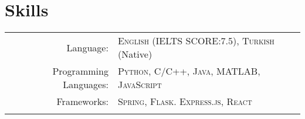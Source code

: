 \documentclass[a4paper,10pt]{article} %
\begin{document}


\section{Skills}

\begin{longtable}{rl}
Language: & \textsc{English} \small(IELTS SCORE:7.5), \textsc{Turkish} \small(Native)\\

Programming Languages: & \textsc{Python}, \textsc{C/C++}, \textsc{Java}, \textsc{MATLAB}, \textsc{JavaScript}\\

Frameworks: & \textsc{Spring}, \textsc{Flask}. \textsc{Express.js}, \textsc{React}\\
&\\
\end{longtable}

\end{document}
